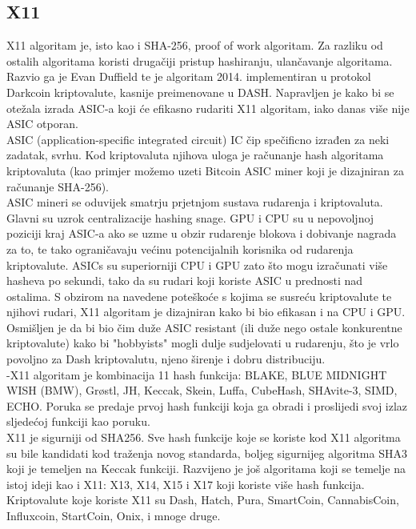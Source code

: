 \documentclass[12pt]{article}
\begin{document}
\pagebreak

\subsection{X11}
X11 algoritam je, isto kao i SHA-256, proof of work algoritam. Za razliku od ostalih algoritama koristi drugačiji pristup hashiranju, ulančavanje algoritama. Razvio ga je Evan Duffield te je algoritam 2014. implementiran u protokol Darkcoin kriptovalute, kasnije preimenovane u DASH.
Napravljen je kako bi se otežala izrada ASIC-a koji će efikasno rudariti X11 algoritam, iako danas više nije ASIC otporan.\\
ASIC (application-specific integrated circuit) IC čip spečificno izrađen za neki zadatak, svrhu. Kod kriptovaluta njihova uloga je računanje hash algoritama kriptovaluta (kao primjer možemo uzeti Bitcoin ASIC miner koji je dizajniran za računanje SHA-256). \\
ASIC mineri se oduvijek smatrju prjetnjom sustava rudarenja i kriptovaluta. Glavni su uzrok centralizacije hashing snage. GPU i CPU su u nepovoljnoj poziciji kraj ASIC-a ako se uzme u obzir rudarenje blokova i dobivanje nagrada za to, te tako ograničavaju većinu potencijalnih korisnika od rudarenja kriptovalute. 
ASICs su superiorniji CPU i GPU zato što mogu izračunati više hasheva po sekundi, tako da su rudari koji koriste ASIC u prednosti nad ostalima.
S obzirom na navedene poteškoće s kojima se susreću kriptovalute te njihovi rudari, X11 algoritam je dizajniran kako bi bio efikasan i na CPU i GPU. Osmišljen je da bi bio čim duže ASIC resistant (ili duže nego ostale konkurentne kriptovalute) kako bi "hobbyists" mogli dulje sudjelovati u rudarenju, što je vrlo povoljno za Dash kriptovalutu, njeno širenje i dobru distribuciju. \\  
-X11 algoritam je kombinacija 11 hash funkcija: BLAKE, BLUE MIDNIGHT WISH (BMW), Grøstl, JH, Keccak, Skein, Luffa, CubeHash, SHAvite-3, SIMD, ECHO. Poruka se predaje prvoj hash funkciji koja ga obradi i proslijedi svoj izlaz sljedećoj funkciji kao poruku.\\
X11 je sigurniji od SHA256. Sve hash funkcije koje se koriste kod X11 algoritma su bile kandidati kod traženja novog standarda, boljeg sigurnijeg algoritma SHA3 koji je temeljen na Keccak funkciji.
Razvijeno je još algoritama koji se temelje na istoj ideji kao i X11: X13, X14, X15 i X17 koji koriste više hash funkcija.\\
Kriptovalute koje koriste X11 su Dash, Hatch, Pura, SmartCoin, CannabisCoin, Influxcoin, StartCoin, Onix, i mnoge druge.\cite{x11-description}
\end{document}
